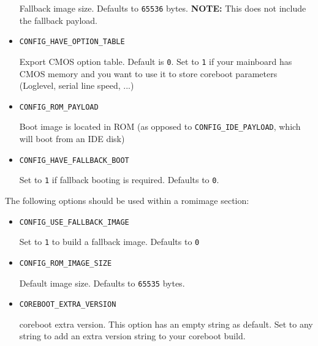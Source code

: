 \documentclass[titlepage,12pt]{article}
\begin{document}
\begin{itemize}
Fallback image size. Defaults to \texttt{65536} bytes. \textbf{NOTE:}
This does not include the fallback payload.

\item \begin{verbatim}CONFIG_HAVE_OPTION_TABLE\end{verbatim}

Export CMOS option table. Default is \texttt{0}. Set to \texttt{1} if
your mainboard has CMOS memory and you want to use it to store
coreboot parameters (Loglevel, serial line speed, ...)

\item \begin{verbatim}CONFIG_ROM_PAYLOAD\end{verbatim}

Boot image is located in ROM (as opposed to \texttt{CONFIG\_IDE\_PAYLOAD}, which
will boot from an IDE disk)

\item \begin{verbatim}CONFIG_HAVE_FALLBACK_BOOT\end{verbatim}

Set to \texttt{1} if fallback booting is required. Defaults to
\texttt{0}.

\end{itemize}


The following options should be used within a romimage section:

\begin{itemize}

\item \begin{verbatim}CONFIG_USE_FALLBACK_IMAGE\end{verbatim}

Set to \texttt{1} to build a fallback image. Defaults to \texttt{0}

\item \begin{verbatim}CONFIG_ROM_IMAGE_SIZE\end{verbatim}

Default image size. Defaults to \texttt{65535} bytes.

\item \begin{verbatim}COREBOOT_EXTRA_VERSION\end{verbatim}

coreboot extra version. This option has an empty string as default. Set
to any string to add an extra version string to your coreboot build.

\end{itemize}
\end{document}
